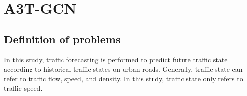 \documentclass[10pt,journal,compsoc]{IEEEtran}
\begin{document}
%


\section{A3T-GCN}
\subsection{Definition of problems}
\par In this study, traffic forecasting is performed to predict future traffic state according to historical traffic states on urban roads. Generally, traffic state can refer to traffic flow, speed, and density. In this study, traffic state only refers to traffic speed.
\end{document}

